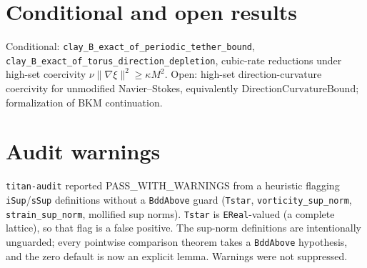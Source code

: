\documentclass[11pt]{article}
\begin{document}
\section{Conditional and open results}
Conditional: \texttt{clay\_B\_exact\_of\_periodic\_tether\_bound}, \texttt{clay\_B\_exact\_of\_torus\_direction\_depletion}, cubic-rate reductions under high-set coercivity $\nu\|\nabla\xi\|^2\ge\kappa M^2$. Open: high-set direction-curvature coercivity for unmodified Navier--Stokes, equivalently $\mathrm{DirectionCurvatureBound}$; formalization of BKM continuation.
\section{Audit warnings}
\texttt{titan-audit} reported PASS\_WITH\_WARNINGS from a heuristic flagging \texttt{iSup}/\texttt{sSup} definitions without a \texttt{BddAbove} guard (\texttt{Tstar}, \texttt{vorticity\_sup\_norm}, \texttt{strain\_sup\_norm}, mollified sup norms). \texttt{Tstar} is \texttt{EReal}-valued (a complete lattice), so that flag is a false positive. The sup-norm definitions are intentionally unguarded; every pointwise comparison theorem takes a \texttt{BddAbove} hypothesis, and the zero default is now an explicit lemma. Warnings were not suppressed.
\end{document}
